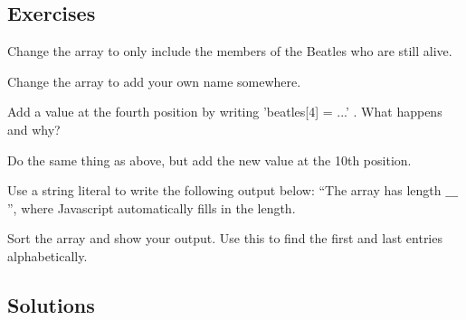 \documentclass[english,11pt,a4paper]{report}
\begin{document}
\subsection{Exercises}

\begin{ex}
Change the array to only include the members of the Beatles who are still alive.
\end{ex}

\begin{ex}
Change the array to add your own name somewhere.
\end{ex}

\begin{ex}
Add a value at the fourth position by writing 'beatles[4] = ...' . What happens and why?
\end{ex}

\begin{ex}
Do the same thing as above, but add the new value at the 10th position.
\end{ex}

\begin{ex}
Use a string literal to write the following output below: ``The array has length $\_\_\_$'', where Javascript automatically fills in the length.
\end{ex}

\begin{ex}
Sort the array and show your output. Use this to find the first and last entries alphabetically.
\end{ex}


\subsection{Solutions}
\end{document}
